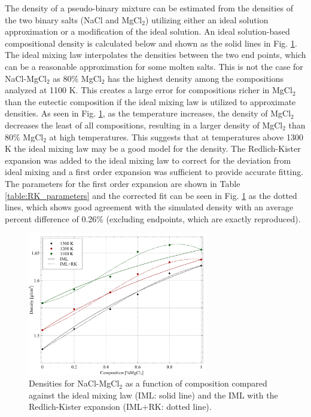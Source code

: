 \documentclass[review]{elsarticle}
\begin{document}
The density of a pseudo-binary mixture can be estimated from the densities of the two binary salts (NaCl and MgCl$_2$) utilizing either an ideal solution approximation or a modification of the ideal solution. An ideal solution-based compositional density is calculated below and shown as the solid lines in Fig. \ref{fig:density_mixing}. The ideal mixing law interpolates the densities between the two end points, which can be a reasonable approximation for some molten salts. This is not the case for NaCl-MgCl$_2$ as 80\% MgCl$_2$ has the highest density among the compositions analyzed at 1100 K. This creates a large error for compositions richer in MgCl$_2$ than the eutectic composition if the ideal mixing law is utilized to approximate densities. As seen in Fig. \ref{fig:density_mixing}, as the temperature increases, the density of MgCl$_2$ decreases the least of all compositions, resulting in a larger density of MgCl$_2$ than 80\% MgCl$_2$ at high temperatures. This suggests that at temperatures above 1300 K the ideal mixing law may be a good model for the density. The Redlich-Kister expansion was added to the ideal mixing law to correct for the deviation from ideal mixing and a first order expansion was sufficient to provide accurate fitting. The parameters for the first order expansion are shown in Table \ref{table:RK_parameters} and the corrected fit can be seen in Fig. \ref{fig:density_mixing} as the dotted lines, which shows good agreement with the simulated density with an average percent difference of 0.26\% (excluding endpoints, which are exactly reproduced). 

\begin{figure}[h]
 \centering
 \includegraphics[width=0.7\textwidth]{density_mixing.jpg} 
 \caption{Densities for NaCl-MgCl$_2$ as a function of composition compared against the ideal mixing law (IML: solid line) and the IML with the Redlich-Kister expansion (IML+RK: dotted line).}
 \label{fig:density_mixing}
\end{figure} 
\end{document}
